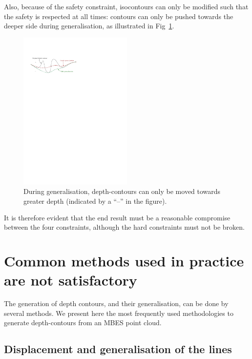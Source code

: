 Also, because of the safety constraint, isocontours can only be modified such that the safety is respected at all times: contours can only be pushed towards the deeper side during generalisation, as illustrated in Fig~\ref{fig:genvalidornot}. 
\begin{figure}
  \centering
  \includegraphics[width=0.5\textwidth]{figs/genvalidornot}
  \caption{During generalisation, depth-contours can only be moved towards greater depth (indicated by a ``--'' in the figure).}
\label{fig:genvalidornot}
\end{figure}
It is therefore evident that the end result must be a reasonable compromise between the four constraints, although the hard constraints must not be broken.


\section{Common methods used in practice are not satisfactory}

The generation of depth contours, and their generalisation, can be done by several methods.
We present here the most frequently used methodologies to generate depth-contours from an MBES point cloud.


\subsection{Displacement and generalisation of the lines}

